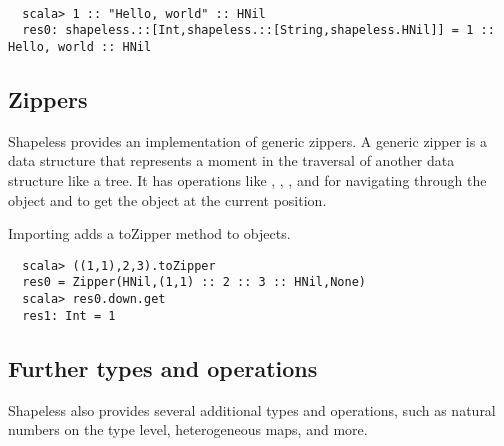 \begin{example} {\ } %
\begin{lstlisting}
  scala> 1 :: "Hello, world" :: HNil
  res0: shapeless.::[Int,shapeless.::[String,shapeless.HNil]] = 1 :: Hello, world :: HNil
\end{lstlisting}
\end{example}

\subsection{Zippers}
Shapeless provides an implementation of generic zippers. A generic zipper is
a data structure that represents a moment in the traversal of another data
structure like a tree. It has operations like , , ,
and  for navigating through the object and  to get the object
at the current position.

\begin{example}
Importing  adds a toZipper method to objects.

\begin{lstlisting}
  scala> ((1,1),2,3).toZipper
  res0 = Zipper(HNil,(1,1) :: 2 :: 3 :: HNil,None)
  scala> res0.down.get
  res1: Int = 1
\end{lstlisting}
\end{example}

\subsection{Further types and operations}
Shapeless also provides several additional types and operations, such as
natural numbers on the type level, heterogeneous maps, and more.
